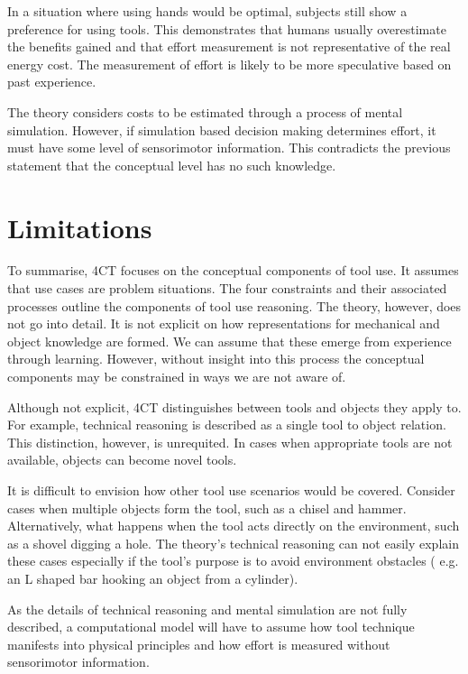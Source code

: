 \documentclass[11]{article}
\begin{document}
In a situation where using hands would be optimal, subjects still show a preference for using tools\cite{osiurak2014}. This demonstrates that humans usually overestimate the benefits gained and that effort measurement is not representative of the real energy cost. The measurement of effort is likely to be more speculative based on past experience. 

The theory considers costs to be estimated through a process of mental simulation. However, if simulation based decision making determines effort, it must have some level of sensorimotor information. This contradicts the previous statement that the conceptual level has no such knowledge.

\section{Limitations}
To summarise, 4CT focuses on the conceptual components of tool use. It assumes that use cases are problem situations\cite{osiurak2014}. The four constraints and their associated processes outline the components of tool use reasoning. The theory, however, does not go into detail. It is not explicit on how representations for mechanical and object knowledge are formed. We can assume that these emerge from experience through learning. However, without insight into this process the conceptual components may be constrained in ways we are not aware of.

Although not explicit, 4CT distinguishes between tools and objects they apply to. For example, technical reasoning is described as a single tool to object relation. This distinction, however, is unrequited. In cases when appropriate tools are not available, objects can become novel tools.

It is difficult to envision how other tool use scenarios would be covered. Consider cases when multiple objects form the tool, such as a chisel and hammer. Alternatively, what happens when the tool acts directly on the environment, such as a shovel digging a hole. The theory's technical reasoning can not easily explain these cases especially if the tool's purpose is to avoid environment obstacles ( e.g. an L shaped bar hooking an object from a cylinder).

As the details of technical reasoning and mental simulation are not fully described, a computational model will have to assume how tool technique manifests into physical principles and how effort is measured without sensorimotor information. 
\end{document}
